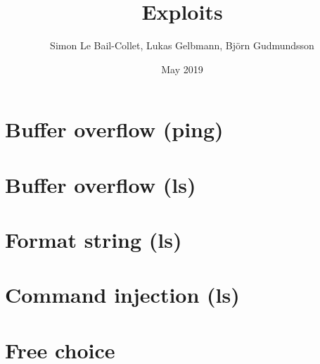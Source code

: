 \documentclass{article}
\title{Exploits}
\author{Simon Le Bail-Collet, Lukas Gelbmann, Björn Gudmundsson}
\date{May 2019}
\begin{document}
\maketitle

\section{Buffer overflow (ping)}

\section{Buffer overflow (ls)}

\section{Format string (ls)}

\section{Command injection (ls)}

\section{Free choice}
\end{document}
